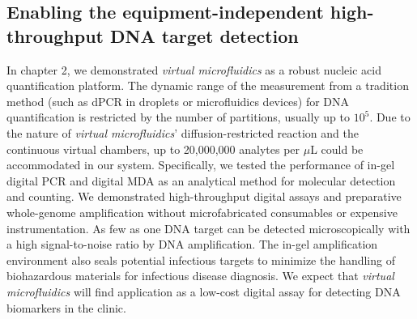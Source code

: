 \subsection{Enabling the equipment-independent high-throughput DNA target detection}
In chapter 2, we demonstrated \textit{virtual microfluidics} as a robust nucleic acid quantification platform. The dynamic range of the measurement from a tradition method (such as dPCR in droplets or microfluidics devices) for DNA quantification is restricted by the number of partitions, usually up to $10^5$. Due to the nature of \textit{virtual microfluidics}' diffusion-restricted reaction and the continuous virtual chambers, up to 20,000,000 analytes per $\mu$L could be accommodated in our system. Specifically, we tested the performance of in-gel digital PCR and digital MDA as an analytical method for molecular detection and counting. We demonstrated high-throughput digital assays and preparative whole-genome amplification without microfabricated consumables or expensive instrumentation. As few as one DNA target can be detected microscopically with a high signal-to-noise ratio by DNA amplification. The in-gel amplification environment also seals potential infectious targets to minimize the handling of biohazardous materials for infectious disease diagnosis. We expect that \textit{virtual microfluidics} will find application as a low-cost digital assay for detecting DNA biomarkers in the clinic. 


